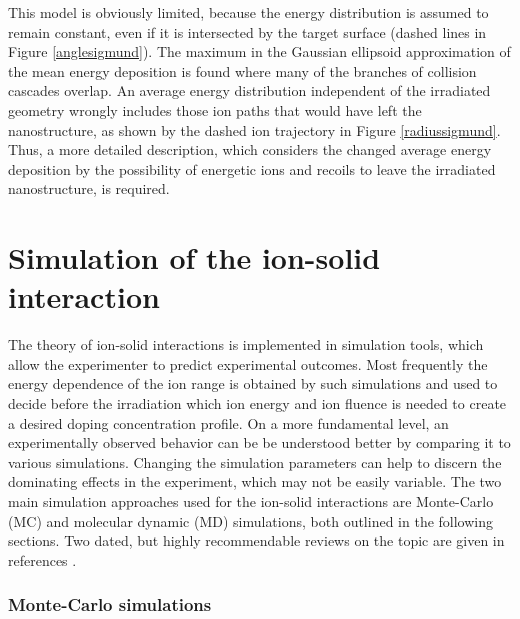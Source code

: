 This model is obviously limited, because the energy distribution is assumed to remain constant, even if it is intersected by the target surface (dashed lines in Figure \ref{anglesigmund}). The maximum in the Gaussian ellipsoid approximation of the mean energy deposition is found where many of the branches of collision cascades overlap. An average energy distribution independent of the irradiated geometry wrongly includes those ion paths that would have left the nanostructure, as shown by the dashed ion trajectory in Figure \ref{radiussigmund}. Thus, a more detailed description, which considers the changed average energy deposition by the possibility of energetic ions and recoils to leave the irradiated nanostructure, is required.


\section{Simulation of the ion-solid interaction}
\label{sec:simion}

The theory of ion-solid interactions is implemented in simulation tools, which allow the experimenter to predict experimental outcomes. Most frequently the energy dependence of the ion range is obtained by such simulations and used to decide before the irradiation which ion energy and ion fluence is needed to create a desired doping concentration profile. On a more fundamental level, an experimentally observed behavior can be be understood better by comparing it to various simulations. Changing the simulation parameters can help to discern the dominating effects in the experiment, which may not be easily variable. The two main simulation approaches used for the ion-solid interactions are Monte-Carlo (MC) and molecular dynamic (MD) simulations, both outlined in the following sections. Two dated, but highly recommendable reviews on the topic are given in references \cite{andersen_computer_1986,eckstein_computer_1991}.

\subsubsection{Monte-Carlo simulations}

